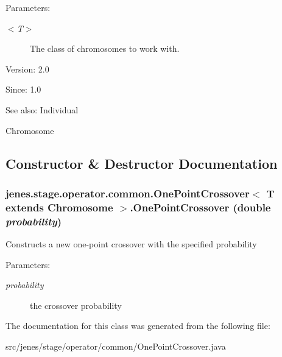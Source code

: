 \begin{Desc}
\item[Parameters:]
\begin{description}
\item[{\em $<$T$>$}]The class of chromosomes to work with.\end{description}
\end{Desc}
\begin{Desc}
\item[Version:]2.0 \end{Desc}
\begin{Desc}
\item[Since:]1.0\end{Desc}
\begin{Desc}
\item[See also:]Individual 

Chromosome \end{Desc}


\subsection{Constructor \& Destructor Documentation}
\hypertarget{classjenes_1_1stage_1_1operator_1_1common_1_1_one_point_crossover_3_01_t_01extends_01_chromosome_01_4_441a51f325e76aa282250ecf2c464635}{
\subsubsection[OnePointCrossover]{\setlength{\rightskip}{0pt plus 5cm}jenes.stage.operator.common.OnePointCrossover$<$ T extends Chromosome $>$.OnePointCrossover (double {\em probability})}}
\label{classjenes_1_1stage_1_1operator_1_1common_1_1_one_point_crossover_3_01_t_01extends_01_chromosome_01_4_441a51f325e76aa282250ecf2c464635}


Constructs a new one-point crossover with the specified probability

\begin{Desc}
\item[Parameters:]
\begin{description}
\item[{\em probability}]the crossover probability \end{description}
\end{Desc}


The documentation for this class was generated from the following file:\begin{CompactItemize}
\item 
src/jenes/stage/operator/common/OnePointCrossover.java\end{CompactItemize}
